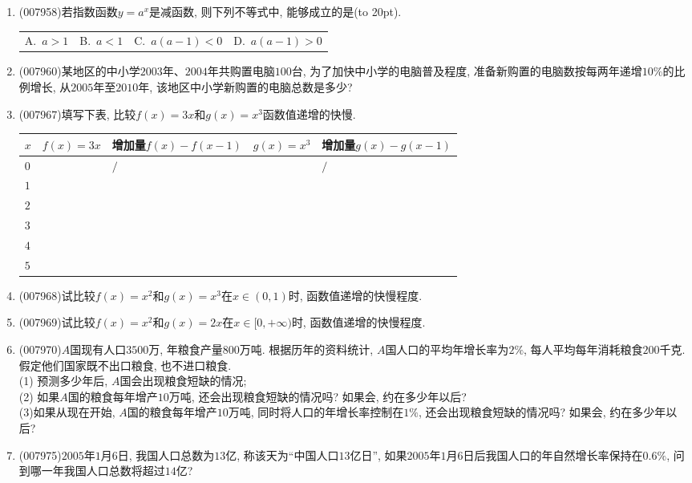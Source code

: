 \documentclass[10pt,a4paper]{article}
\newcommand{\bracket}[1]{(\hbox to #1pt{})}
\newcommand{\fourch}[4]{\par\begin{tabular}{p{.23\textwidth}p{.23\textwidth}p{.23\textwidth}p{.23\textwidth}}
A.~#1 &B.~#2& C.~#3& D.~#4
\end{tabular}}
\begin{document}
\begin{enumerate}[1.]
\item {\tiny (007958)}若指数函数$y=a^x$是减函数, 则下列不等式中, 能够成立的是\bracket{20}.
\fourch{$a>1$}{$a<1$}{$a(a-1)<0$}{$a(a-1)>0$}
\item {\tiny (007960)}某地区的中小学$2003$年、$2004$年共购置电脑$100$台, 为了加快中小学的电脑普及程度, 准备新购置的电脑数按每两年递增$10\%$的比例增长, 从$2005$年至$2010$年, 该地区中小学新购置的电脑总数是多少?
\item {\tiny (007967)}填写下表, 比较$f(x)=3x$和$g(x)=x^3$函数值递增的快慢.
\begin{center}
    \begin{tabular}{|p{}<{\centering}|p{}<{\centering}|p{}<{\centering}|p{}<{\centering}|p{}<{\centering}|}
        \hline
        $x$ & $f(x)=3x$ & 增加量$f(x)-f(x-1)$ & $g(x)=x^3$ & 增加量$g(x)-g(x-1)$ \\ \hline
        $0$ & & $\slash$ & & $\slash$ \\ \hline
        $1$ & & & & \\ \hline
        $2$ & & & & \\ \hline
        $3$ & & & & \\ \hline
        $4$ & & & & \\ \hline
        $5$ & & & & \\ \hline
    \end{tabular}
\end{center}
\item {\tiny (007968)}试比较$f(x)=x^2$和$g(x)=x^3$在$x\in (0,1)$时, 函数值递增的快慢程度.
\item {\tiny (007969)}试比较$f(x)=x^2$和$g(x)=2x$在$x\in [0, +\infty)$时, 函数值递增的快慢程度.
\item {\tiny (007970)}$A$国现有人口$3500$万, 年粮食产量$800$万吨. 根据历年的资料统计, $A$国人口的平均年增长率为$2\%$, 每人平均每年消耗粮食$200$千克. 假定他们国家既不出口粮食, 也不进口粮食.\\
(1) 预测多少年后, $A$国会出现粮食短缺的情况;\\
(2) 如果$A$国的粮食每年增产$10$万吨, 还会出现粮食短缺的情况吗? 如果会, 约在多少年以后?\\
(3)如果从现在开始, $A$国的粮食每年增产$10$万吨, 同时将人口的年增长率控制在$1\%$, 还会出现粮食短缺的情况吗? 如果会, 约在多少年以后?
\item {\tiny (007975)}$2005$年$1$月$6$日, 我国人口总数为$13$亿, 称该天为``中国人口$13$亿日'', 如果$2005$年$1$月$6$日后我国人口的年自然增长率保持在$0.6\%$, 问到哪一年我国人口总数将超过$14$亿?

\end{enumerate}
\end{document}
